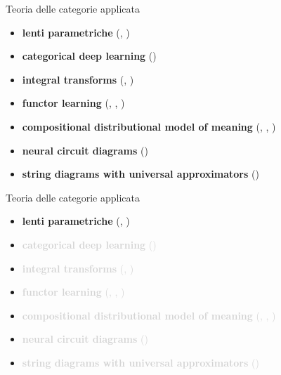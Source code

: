 \documentclass{beamer}
\begin{document}
\begin{frame}{Teoria delle categorie applicata}
    \begin{itemize}
        \item \textbf{lenti parametriche} {\footnotesize (\cite{gavranovic2024fundamental}, \cite{cruttwell2022categorical})}
        \item \textbf{categorical deep learning} {\footnotesize(\cite{gavranovicposition})}
        \item \textbf{integral transforms} {\footnotesize(\cite{dudzik2022graph}, \cite{dudzik2024asynchronous})}
        \item \textbf{functor learning} {\footnotesize(\cite{gavranovic2019compositional}, \cite{sheshmani2021categorical}, \cite{chytas2024poolingimagedatasetsmultiple})}
        \item \textbf{compositional distributional model of meaning} {\footnotesize(\cite{clark2007combining}, \cite{coecke2010mathematical}, \cite{lewis2019compositionality})}
        \item \textbf{neural circuit diagrams} {\footnotesize(\cite{abbott2023robust})}
        \item \textbf{string diagrams with universal approximators} {\footnotesize(\cite{khatri2024anatomy})}
    \end{itemize}
\end{frame}

\begin{frame}{Teoria delle categorie applicata}
    \begin{itemize}
        \item \textbf{lenti parametriche} {\footnotesize (\cite{gavranovic2024fundamental}, \cite{cruttwell2022categorical})}
        \item \textcolor{lightgray}{\textbf{categorical deep learning} {\footnotesize(\cite{gavranovicposition})}}
        \item \textcolor{lightgray}{\textbf{integral transforms} {\footnotesize(\cite{dudzik2022graph}, \cite{dudzik2024asynchronous})}}
        \item \textcolor{lightgray}{\textbf{functor learning} {\footnotesize(\cite{gavranovic2019compositional}, \cite{sheshmani2021categorical}, \cite{chytas2024poolingimagedatasetsmultiple})}}
        \item \textcolor{lightgray}{\textbf{compositional distributional model of meaning} {\footnotesize(\cite{clark2007combining}, \cite{coecke2010mathematical}, \cite{lewis2019compositionality})}}
        \item \textcolor{lightgray}{\textbf{neural circuit diagrams} {\footnotesize(\cite{abbott2023robust})}}
        \item \textcolor{lightgray}{\textbf{string diagrams with universal approximators} {\footnotesize(\cite{khatri2024anatomy})}}
    \end{itemize}
\end{frame}
\end{document}
